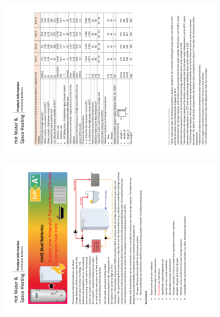 \newpage
\begin{figure}
	\centering
	\includegraphics[height=0.48\textheight]{Appendices/5_PIS_Dual_02.png}
	\label{app:dualPIS}
\end{figure}

\begin{figure}
	\centering
	\includegraphics[height=0.48\textheight]{Appendices/5_PIS_Dual_01.png}
\end{figure}


